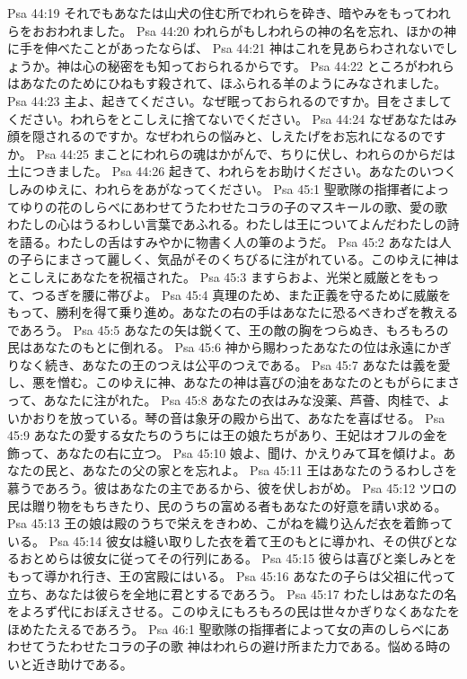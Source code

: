 Psa 44:19  それでもあなたは山犬の住む所でわれらを砕き、暗やみをもってわれらをおおわれました。
Psa 44:20  われらがもしわれらの神の名を忘れ、ほかの神に手を伸べたことがあったならば、
Psa 44:21  神はこれを見あらわされないでしょうか。神は心の秘密をも知っておられるからです。
Psa 44:22  ところがわれらはあなたのためにひねもす殺されて、ほふられる羊のようにみなされました。
Psa 44:23  主よ、起きてください。なぜ眠っておられるのですか。目をさましてください。われらをとこしえに捨てないでください。
Psa 44:24  なぜあなたはみ顔を隠されるのですか。なぜわれらの悩みと、しえたげをお忘れになるのですか。
Psa 44:25  まことにわれらの魂はかがんで、ちりに伏し、われらのからだは土につきました。
Psa 44:26  起きて、われらをお助けください。あなたのいつくしみのゆえに、われらをあがなってください。
Psa 45:1  聖歌隊の指揮者によってゆりの花のしらべにあわせてうたわせたコラの子のマスキールの歌、愛の歌 わたしの心はうるわしい言葉であふれる。わたしは王についてよんだわたしの詩を語る。わたしの舌はすみやかに物書く人の筆のようだ。
Psa 45:2  あなたは人の子らにまさって麗しく、気品がそのくちびるに注がれている。このゆえに神はとこしえにあなたを祝福された。
Psa 45:3  ますらおよ、光栄と威厳とをもって、つるぎを腰に帯びよ。
Psa 45:4  真理のため、また正義を守るために威厳をもって、勝利を得て乗り進め。あなたの右の手はあなたに恐るべきわざを教えるであろう。
Psa 45:5  あなたの矢は鋭くて、王の敵の胸をつらぬき、もろもろの民はあなたのもとに倒れる。
Psa 45:6  神から賜わったあなたの位は永遠にかぎりなく続き、あなたの王のつえは公平のつえである。
Psa 45:7  あなたは義を愛し、悪を憎む。このゆえに神、あなたの神は喜びの油をあなたのともがらにまさって、あなたに注がれた。
Psa 45:8  あなたの衣はみな没薬、芦薈、肉桂で、よいかおりを放っている。琴の音は象牙の殿から出て、あなたを喜ばせる。
Psa 45:9  あなたの愛する女たちのうちには王の娘たちがあり、王妃はオフルの金を飾って、あなたの右に立つ。
Psa 45:10  娘よ、聞け、かえりみて耳を傾けよ。あなたの民と、あなたの父の家とを忘れよ。
Psa 45:11  王はあなたのうるわしさを慕うであろう。彼はあなたの主であるから、彼を伏しおがめ。
Psa 45:12  ツロの民は贈り物をもちきたり、民のうちの富める者もあなたの好意を請い求める。
Psa 45:13  王の娘は殿のうちで栄えをきわめ、こがねを織り込んだ衣を着飾っている。
Psa 45:14  彼女は縫い取りした衣を着て王のもとに導かれ、その供びとなるおとめらは彼女に従ってその行列にある。
Psa 45:15  彼らは喜びと楽しみとをもって導かれ行き、王の宮殿にはいる。
Psa 45:16  あなたの子らは父祖に代って立ち、あなたは彼らを全地に君とするであろう。
Psa 45:17  わたしはあなたの名をよろず代におぼえさせる。このゆえにもろもろの民は世々かぎりなくあなたをほめたたえるであろう。
Psa 46:1  聖歌隊の指揮者によって女の声のしらべにあわせてうたわせたコラの子の歌 神はわれらの避け所また力である。悩める時のいと近き助けである。
